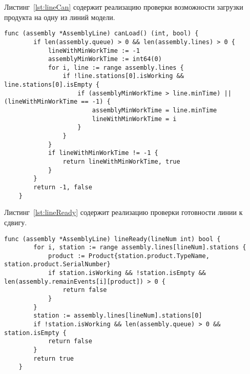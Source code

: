 Листинг~\ref{lst:lineCan} содержит реализацию проверки возможности загрузки продукта на одну из линий модели.

\begin{lstlisting}[language=Golang,caption={Метод, определяющий возможность загрузки продукции на одну из линий},label=lst:lineCan]
	func (assembly *AssemblyLine) canLoad() (int, bool) {
		if len(assembly.queue) > 0 && len(assembly.lines) > 0 {
			lineWithMinWorkTime := -1
			assemblyMinWorkTime := int64(0)
			for i, line := range assembly.lines {
				if !line.stations[0].isWorking && line.stations[0].isEmpty {
					if (assemblyMinWorkTime > line.minTime) || (lineWithMinWorkTime == -1) {
						assemblyMinWorkTime = line.minTime
						lineWithMinWorkTime = i
					}
				}
			}
			if lineWithMinWorkTime != -1 {
				return lineWithMinWorkTime, true
			}
		}
		return -1, false
	}
\end{lstlisting}

Листинг~\ref{lst:lineReady} содержит реализацию проверки готовности линии к сдвигу.

\begin{lstlisting}[language=Golang,caption={Метод, производящий проверку готовности линии к сдвигу},label=lst:lineReady]
	func (assembly *AssemblyLine) lineReady(lineNum int) bool {
		for i, station := range assembly.lines[lineNum].stations {
			product := Product{station.product.TypeName, station.product.SerialNumber}
			if station.isWorking && !station.isEmpty && len(assembly.remainEvents[i][product]) > 0 {
				return false
			}
		}
		station := assembly.lines[lineNum].stations[0]
		if !station.isWorking && len(assembly.queue) > 0 && station.isEmpty {
			return false
		}
		return true
	}
\end{lstlisting}